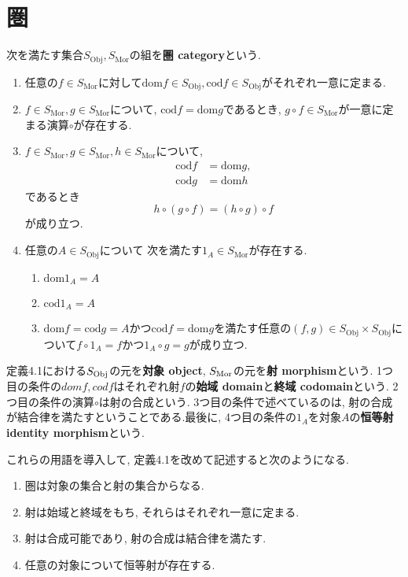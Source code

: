 \section{圏}
\begin{Def}
次を満たす集合$S_{\mathrm{Obj}},S_{\mathrm{Mor}}$の組を{\bf 圏 category}という.
\begin{enumerate}
\item 任意の$f\in S_\mathrm{Mor}$に対して$\mathrm{dom}f\in S_\mathrm{Obj},\mathrm{cod}f\in S_\mathrm{Obj}$がそれぞれ一意に定まる.
\item $f\in S_{\mathrm{Mor}},g\in S_{\mathrm{Mor}}$について,
$\mathrm{cod}f=\mathrm{dom}g$であるとき,
$g\circ f\in S_{\mathrm{Mor}}$が一意に定まる演算$\circ$が存在する.
\item $f\in S_{\mathrm{Mor}},g\in S_{\mathrm{Mor}},h\in S_{\mathrm{Mor}}$について, \begin{align*}
\mathrm{cod} f&=\mathrm{dom} g,\\ \mathrm{cod} g&=\mathrm{dom} h
\end{align*}であるとき
\[
h\circ(g\circ f)=(h\circ g)\circ f
\]
が成り立つ.
\item 任意の$A\in S_{\mathrm{Obj}}$について
次を満たす$1_A\in S_{\mathrm{Mor}}$が存在する.
\begin{enumerate}
\item
$\mathrm{dom}1_{A}=A$
\item
$\mathrm{cod}1_A=A$
\item $\mathrm{dom} f=\mathrm{cod} g=A$かつ$\mathrm{cod} f=\mathrm{dom}g$を満たす任意の$(f,g)\in S_{\mathrm{Obj}}\times S_{\mathrm{Obj}}$について$f\circ 1_A=f$かつ$1_A\circ g=g$が成り立つ.
\end{enumerate}
\end{enumerate}
\end{Def}
定義4.1における$S_{\rm Obj}$の元を{\bf 対象 object}, $S_{\rm Mor}$の元を{\bf 射 morphism}という.
1つ目の条件の$dom f,cod f$はそれぞれ射$f$の{\bf 始域 domain}と{\bf 終域 codomain}という. 2つ目の条件の演算$\circ$は射の合成という. 3つ目の条件で述べているのは, 射の合成が結合律を満たすということである.最後に, 4つ目の条件の$1_A$を対象$A$の{\bf 恒等射 identity morphism}という.

これらの用語を導入して, 定義4.1を改めて記述すると次のようになる.
\begin{enumerate}
\item
圏は対象の集合と射の集合からなる.
\item
射は始域と終域をもち, それらはそれぞれ一意に定まる.
\item
射は合成可能であり, 射の合成は結合律を満たす.
\item
任意の対象について恒等射が存在する.
\end{enumerate}


